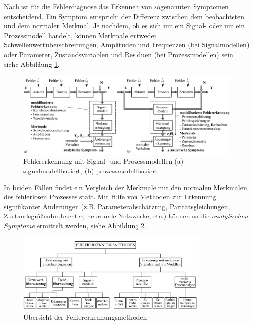 Nach \cite{Isermann.2010} ist für die Fehlerdiagnose das Erkennen von sogenannten Symptomen entscheidend. Ein Symptom entspricht der Differenz zwischen dem beobachteten und dem normalen Merkmal. Je nachdem, ob es sich um ein Signal- oder um ein Prozessmodell handelt, können Merkmale entweder Schwellenwertüberschreitungen, Amplituden und Frequenzen (bei Signalmodellen) oder Parameter, Zustandsvariablen und Residuen (bei Prozessmodellen) sein, siehe Abbildung \ref{fig:symptome}. \cite{Isermann.2010}

\begin{figure} 
	\centering
	\includegraphics[width=1.0\textwidth]{images/symptome}
	\caption{Fehlererkennung mit Signal- und Prozessmodellen (a) signalmodellbasiert, (b) prozessmodellbasiert. \cite{Isermann.2010}}
	\label{fig:symptome}
\end{figure}



In beiden Fällen findet ein Vergleich der Merkmale mit den normalen Merkmalen des fehlerlosen Prozesses statt. Mit Hilfe von Methoden zur Erkennung signifikanter Änderungen (z.B. Parameterabschätzung, Paritätsgleichungen, Zustandsgrößenbeobachter, neuronale Netzwerke, etc.) können so die \textit{analytischen Symptome} ermittelt werden, siehe Abbildung \ref{fig:fehlererkennungsmethoden}. \cite{Isermann.2010}

\begin{figure} 
	\centering
	\includegraphics[width=0.85\textwidth]{images/fehlererkennungsmethoden}
	\caption{Übersicht der Fehlererkennungsmethoden \cite{Isermann.2010}}
	\label{fig:fehlererkennungsmethoden}
\end{figure}



